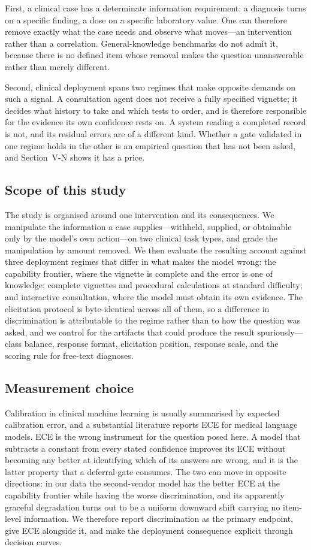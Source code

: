 \documentclass[journal,twoside]{IEEEtran}
\begin{document}
First, a clinical case has a determinate information requirement: a diagnosis turns on a specific
finding, a dose on a specific laboratory value. One can therefore remove exactly what the case needs
and observe what moves---an intervention rather than a correlation. General-knowledge benchmarks do
not admit it, because there is no defined item whose removal makes the question unanswerable rather
than merely different.

Second, clinical deployment spans two regimes that make opposite demands on such a signal. A
consultation agent does not receive a fully specified vignette; it decides what history to take and
which tests to order, and is therefore responsible for the evidence its own confidence rests on. A
system reading a completed record is not, and its residual errors are of a different kind. Whether a
gate validated in one regime holds in the other is an empirical question that has not been asked, and
Section~V-N shows it has a price.

\subsection{Scope of this study}
The study is organised around one intervention and its consequences. We manipulate the information a
case supplies---withheld, supplied, or obtainable only by the model's own action---on two clinical
task types, and grade the manipulation by amount removed. We then evaluate the resulting account
against three deployment regimes that differ in what makes the model wrong: the capability frontier,
where the vignette is complete and the error is one of knowledge; complete vignettes and procedural
calculations at standard difficulty; and interactive consultation, where the model must obtain its
own evidence. The elicitation protocol is byte-identical across all of them, so a difference in
discrimination is attributable to the regime rather than to how the question was asked, and we
control for the artifacts that could produce the result spuriously---class balance, response format,
elicitation position, response scale, and the scoring rule for free-text diagnoses.

\subsection{Measurement choice}
Calibration in clinical machine learning is usually summarised by expected calibration error, and a
substantial literature reports ECE for medical language models. ECE is the wrong instrument for the
question posed here. A model that subtracts a constant from every stated confidence improves its ECE
without becoming any better at identifying which of its answers are wrong, and it is the latter
property that a deferral gate consumes. The two can move in opposite directions: in our data the
second-vendor model has the better ECE at the capability frontier while having the worse
discrimination, and its apparently graceful degradation turns out to be a uniform downward shift
carrying no item-level information. We therefore report discrimination as the primary endpoint,
give ECE alongside it, and make the deployment consequence explicit through decision curves.
\end{document}
